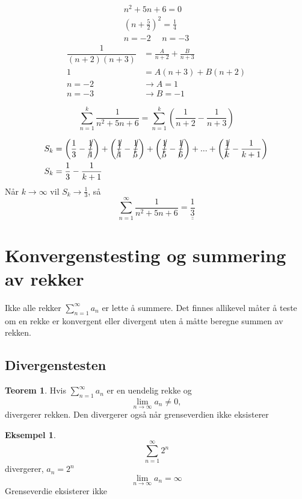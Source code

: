 \documentclass[11pt]{article}
\theoremstyle{definition}
\theoremstyle{definition}
\newtheorem{mitteks}{Eksempel}[section]
\theoremstyle{definition}
\theoremstyle{definition}
\newtheorem{teo}{Teorem}[section]
\newenvironment{fteo}
{\begin{mdframed}[style=minstil]\begin{teo}}
		{\end{teo}\end{mdframed}}
\theoremstyle{definition}
\theoremstyle{definition}
\begin{document}
		\begin{align*}
		n^2+5n+6=0\\
		(n+\frac{5}{2})^2=\frac{1}{4}\\
		n=-2 \hspace{16pt} n=-3
		\end{align*}
		\begin{align*}
		\dfrac{1}{(n+2)(n+3)}&=\frac{A}{n+2}+\frac{B}{n+3}\\
		1&=A(n+3)+B(n+2)\\
		n=-2 &\rightarrow A=1\\
		n=-3 &\rightarrow B=-1
		\end{align*}
		
		\[\sum_{n=1}^{k}\dfrac{1}{n^2+5n+6}=\sum_{n=1}^{k}\left(\frac{1}{n+2}-\dfrac{1}{n+3}\right)\]
		
		\begin{align*}
		S_k&=\left( \frac{1}{3}-\cancel{\frac{1}{4}} \right)+\left( \cancel{\frac{1}{4}}-\cancel{\frac{1}{5}} \right)+\left( \cancel{\frac{1}{5}}-\cancel{\frac{1}{6}} \right)+...+\left( \cancel{\frac{1}{k}}-\frac{1}{k+1} \right)\\
		S_k&= \frac{1}{3}-\frac{1}{k+1}
		\end{align*}
		Når \(k\rightarrow \infty\) vil \(S_k\rightarrow \frac{1}{3}\), så
		\[\displaystyle{\sum_{n=1}^{\infty}\dfrac{1}{n^2+5n+6}}=\underline{\underline{\frac{1}{3}}}\]
		
		
		
		\newpage
		
		\section{Konvergenstesting og summering av rekker}
		Ikke alle rekker \(\displaystyle{\sum_{n=1}^{\infty}a_n}\) er lette å summere. Det finnes allikevel måter å teste om en rekke er konvergent eller divergent uten å måtte beregne summen av rekken.
		\subsection{Divergenstesten}
		\begin{fteo}
			Hvis \(\displaystyle{\sum_{n=1}^{\infty}a_n}\) er en uendelig rekke og \[\lim\limits_{n \rightarrow \infty}a_n\neq 0, \] 
			divergerer rekken. Den divergerer også når grenseverdien ikke eksisterer
		\end{fteo}
		
		\begin{mitteks}
			\[\displaystyle{\sum_{n=1}^{\infty}2^n}\] divergerer, \(a_n=2^n\) \[\lim\limits_{n \rightarrow \infty
				}a_n=\infty \] 
				Grenseverdie eksisterer ikke
		\end{mitteks}
		
\end{document}
